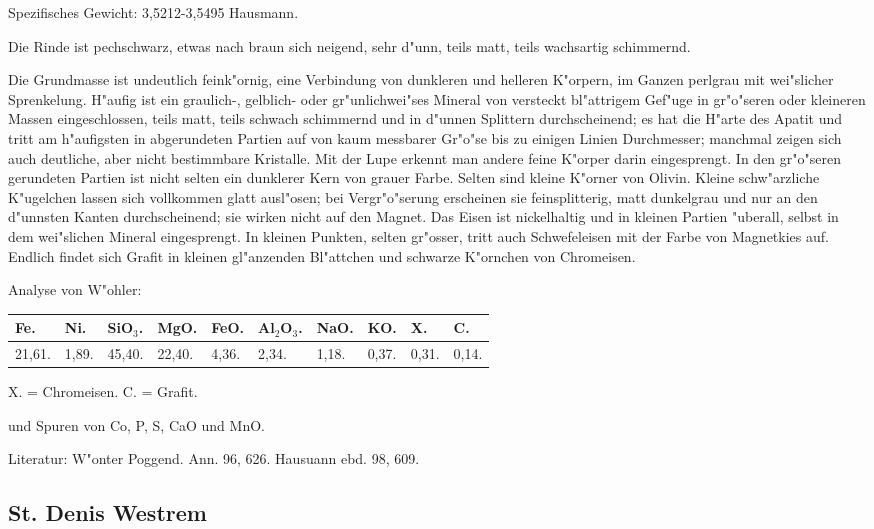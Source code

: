 \documentclass[a4paper, 11pt, oneside]{article}
\begin{document}
Spezifisches Gewicht: 3,5212-3,5495 Hausmann.

Die Rinde ist pechschwarz, etwas nach braun sich neigend, sehr d"unn, teils matt, teils wachsartig schimmernd.

Die Grundmasse ist undeutlich feink"ornig, eine Verbindung von dunkleren und helleren K"orpern, im Ganzen perlgrau mit wei"slicher Sprenkelung. H"aufig ist ein graulich-, gelblich- oder gr"unlichwei"ses Mineral von versteckt bl"attrigem Gef"uge in gr"o"seren oder kleineren Massen eingeschlossen, teils matt, teils schwach schimmernd und in d"unnen Splittern durchscheinend; es hat die H"arte des Apatit und tritt am h"aufigsten in abgerundeten Partien auf von kaum messbarer Gr"o"se bis zu einigen Linien Durchmesser; manchmal zeigen sich auch deutliche, aber nicht bestimmbare Kristalle. Mit der Lupe erkennt man andere feine K"orper darin eingesprengt. In den gr"o"seren gerundeten Partien ist nicht selten ein dunklerer Kern von grauer Farbe. Selten sind kleine K"orner von Olivin. Kleine schw"arzliche K"ugelchen lassen sich vollkommen glatt ausl"osen; bei Vergr"o"serung erscheinen sie feinsplitterig, matt dunkelgrau und nur an den d"unnsten Kanten durchscheinend; sie wirken nicht auf den Magnet. Das Eisen ist nickelhaltig und in kleinen Partien "uberall, selbst in dem wei"slichen Mineral eingesprengt. In kleinen Punkten, selten gr"osser, tritt auch Schwefeleisen mit der Farbe von Magnetkies auf. Endlich findet sich Grafit in kleinen gl"anzenden Bl"attchen und schwarze K"ornchen von Chromeisen.

Analyse von W"ohler:
\begin{table}[!ht]
    \centering
    \footnotesize
    \begin{tabular}{l l l l l l l l l l}
        Fe. & Ni. & SiO$_{3}$. & MgO. & FeO. & Al$_{2}$O$_{3}$. & NaO. & KO. & X. & C. \\ \hline
        21,61. & 1,89. & 45,40. & 22,40. & 4,36. & 2,34. & 1,18. & 0,37. & 0,31. & 0,14. \\
    \end{tabular}
\end{table}

X. = Chromeisen. C. = Grafit.

und Spuren von Co, P, S, CaO und MnO.

\footnotesize
Literatur: W"onter Poggend. Ann. 96, 626. Hausuann ebd. 98, 609.

\subsection{St. Denis Westrem}
\normalsize
\end{document}
